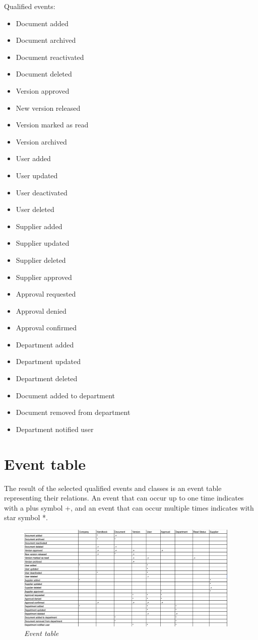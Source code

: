 Qualified events:
\begin{itemize} 
	\item Document added
	\item Document archived
	\item Document reactivated
	\item Document deleted
	\item Version approved
	\item New version released
	\item Version marked as read
	\item Version archived
	\item User added
	\item User updated
	\item User deactivated
	\item User deleted
	\item Supplier added
	\item Supplier updated
	\item Supplier deleted
	\item Supplier approved
	\item Approval requested
	\item Approval denied
	\item Approval confirmed
	\item Department added
	\item Department updated
	\item Department deleted
	\item Document added to department
	\item Document removed from department
	\item Department notified user
\end{itemize}

\section{Event table}
The result of the selected qualified events and classes is an event table representing their relations. An event that can occur up to one time indicates with a plus symbol +, and an event that can occur multiple times indicates with star symbol *.

\begin{figure}[H]
	\centering
	\includegraphics[width=0.95\textwidth]{billeder/Event_table.png}
	\caption{\textit{Event table
	}\label{fig:ClassDiagram}}
\end{figure}


